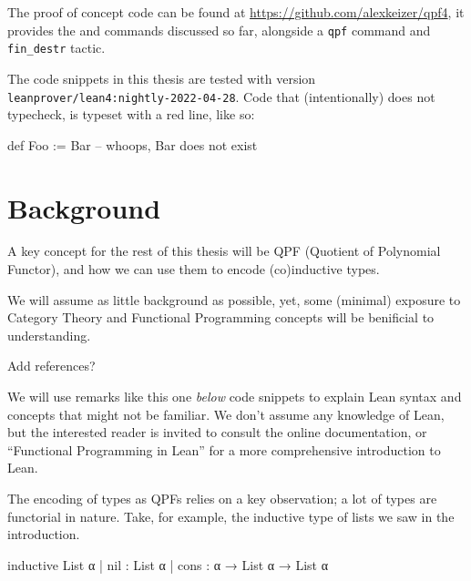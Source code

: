 \documentclass[titlepage]{report}
\newenvironment{remark}{%
\begin{framed}
\begin{trivlist}
    \item[\hskip \labelsep {\bfseries Remark:}]}%
{%
\end{trivlist}%
\end{framed}
}
\newenvironment{todo}{%
\definecolor{shadecolor}{HTML}{F8E0E0}%
\begin{shaded}%
\begin{trivlist}                         
    \item[\hskip \labelsep {\bfseries Todo:}]}{\end{trivlist}\end{shaded}}
\newcommand\data{\lean{data}}
\newcommand\codata{\lean{codata}}
\begin{document}
The proof of concept code can be found at \url{https://github.com/alexkeizer/qpf4}, it provides the \data and \codata commands discussed so far, alongside a \texttt{qpf} command and \texttt{fin\_destr} tactic.

The code snippets in this thesis are tested with version \texttt{leanprover/lean4:nightly-2022-04-28}. Code that (intentionally) does not typecheck, is typeset with a red line, like so:
\begin{badleancode}

    def Foo := Bar -- whoops, Bar does not exist

\end{badleancode}











\chapter{Background}
\label{ch:background}

A key concept for the rest of this thesis will be QPF (Quotient of Polynomial Functor), and how we can use them to encode (co)inductive types.

We will assume as little background as possible, yet, some (minimal) exposure to Category Theory and Functional Programming concepts will be benificial to understanding.

\begin{todo}
    Add references?
\end{todo}

\begin{remark}
    We will use remarks like this one \emph{below} code snippets to explain Lean syntax and concepts that might not be familiar. We don't assume any knowledge of Lean, but the interested reader is invited to consult the online documentation\cite{avigadTheoremProvingLean}, or ``Functional Programming in Lean'' for a more comprehensive introduction to Lean.\cite{christiansenFunctionalProgrammingLean}
\end{remark}



The encoding of types as QPFs relies on a key observation; a lot of types are functorial in nature.
Take, for example, the inductive type of lists we saw in the introduction.
\begin{leancode}
    inductive List α 
    | nil  : List α
    | cons : α → List α → List α
\end{leancode}
\end{document}
